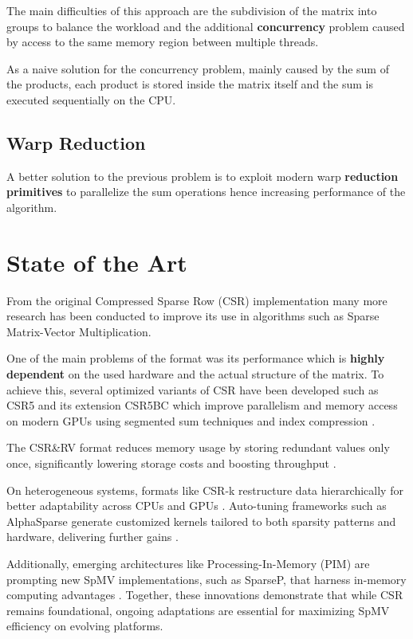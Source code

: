 \documentclass[conference]{IEEEtran}
\begin{document}
    The main difficulties of this approach are the subdivision of the matrix
    into groups to balance the workload and the additional \textbf{concurrency}
    problem caused by access to the same memory region between multiple threads.

    As a naive solution for the concurrency problem, mainly caused by the sum
    of the products, each product is stored inside the matrix itself and the
    sum is executed sequentially on the CPU.

    \subsection{Warp Reduction}

    A better solution to the previous problem is to exploit modern warp
    \textbf{reduction primitives} to parallelize the sum operations hence
    increasing performance of the algorithm.

    \section{State of the Art}

    From the original Compressed Sparse Row (CSR) \cite{eisenstat1977csr}
    implementation many more research has been conducted to improve its use in
    algorithms such as Sparse Matrix-Vector Multiplication.

    One of the main problems of the format was its performance which is
    \textbf{highly dependent} on the used hardware and the actual structure of
    the matrix.
    To achieve this, several optimized variants of CSR have been developed such
    as CSR5 and its extension CSR5BC which improve parallelism and memory
    access on modern GPUs using segmented sum techniques and index compression
    \cite{zhang2016csr5}.

    The CSR\&RV format reduces memory usage by storing redundant values only
    once, significantly lowering storage costs and boosting throughput
    \cite{tang2023csrrv}.

    On heterogeneous systems, formats like CSR-k restructure data
    hierarchically for better adaptability across CPUs and GPUs
    \cite{liu2022csrk}.
    Auto-tuning frameworks such as AlphaSparse generate customized kernels
    tailored to both sparsity patterns and hardware, delivering further gains
    \cite{yin2022alphasparse}.

    Additionally, emerging architectures like Processing-In-Memory (PIM) are
    prompting new SpMV implementations, such as SparseP, that harness in-memory
    computing advantages \cite{lee2022sparsep}.
    Together, these innovations demonstrate that while CSR remains foundational,
    ongoing adaptations are essential for maximizing SpMV efficiency on
    evolving platforms.
\end{document}
